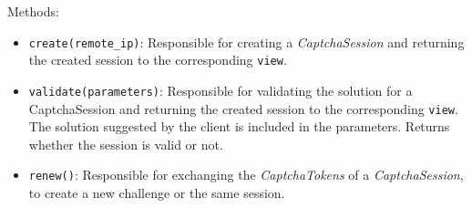Methods: 

\begin{itemize}
\item \verb|create(remote_ip)|: Responsible for creating a \emph{CaptchaSession} and returning the created session to the corresponding \verb|view|.
\item \verb|validate(parameters)|: Responsible for validating the solution for a CaptchaSession and returning the created session to the corresponding \verb|view|. The solution suggested by the client is included in the parameters. Returns whether the session is valid or not.
\item \verb|renew()|: Responsible for exchanging the \emph{CaptchaTokens} of a \emph{CaptchaSession}, to create a new challenge or the same session.
\end{itemize}


\clearpage

